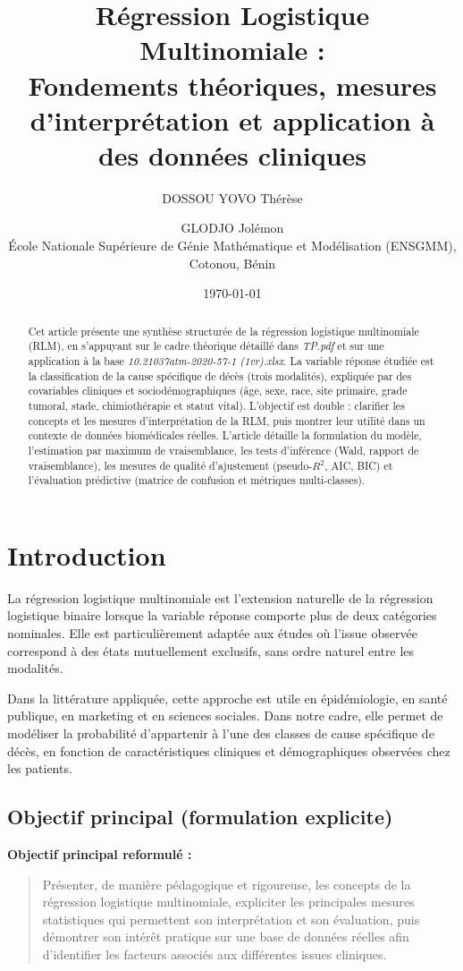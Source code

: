 \documentclass[12pt,a4paper]{article}
\title{\textbf{Régression Logistique Multinomiale :}\\
Fondements théoriques, mesures d'interprétation et application à des données cliniques}
\author{DOSSOU YOVO Thérèse \and GLODJO Jolémon\\
École Nationale Supérieure de Génie Mathématique et Modélisation (ENSGMM), Cotonou, Bénin}
\date{\today}
\begin{document}
\maketitle

\begin{abstract}
Cet article présente une synthèse structurée de la régression logistique multinomiale (RLM), en s'appuyant sur le cadre théorique détaillé dans \textit{TP.pdf} et sur une application à la base \textit{10.21037atm-2020-57-1 (1vr).xlsx}. La variable réponse étudiée est la classification de la cause spécifique de décès (trois modalités), expliquée par des covariables cliniques et sociodémographiques (âge, sexe, race, site primaire, grade tumoral, stade, chimiothérapie et statut vital). L'objectif est double : clarifier les concepts et les mesures d'interprétation de la RLM, puis montrer leur utilité dans un contexte de données biomédicales réelles. L'article détaille la formulation du modèle, l'estimation par maximum de vraisemblance, les tests d'inférence (Wald, rapport de vraisemblance), les mesures de qualité d'ajustement (pseudo-$R^2$, AIC, BIC) et l'évaluation prédictive (matrice de confusion et métriques multi-classes).
\end{abstract}

\section{Introduction}
La régression logistique multinomiale est l'extension naturelle de la régression logistique binaire lorsque la variable réponse comporte plus de deux catégories nominales. Elle est particulièrement adaptée aux études où l'issue observée correspond à des états mutuellement exclusifs, sans ordre naturel entre les modalités.

Dans la littérature appliquée, cette approche est utile en épidémiologie, en santé publique, en marketing et en sciences sociales. Dans notre cadre, elle permet de modéliser la probabilité d'appartenir à l'une des classes de cause spécifique de décès, en fonction de caractéristiques cliniques et démographiques observées chez les patients.

\subsection{Objectif principal (formulation explicite)}
\textbf{Objectif principal reformulé :}
\begin{quote}
Présenter, de manière pédagogique et rigoureuse, les concepts de la régression logistique multinomiale, expliciter les principales mesures statistiques qui permettent son interprétation et son évaluation, puis démontrer son intérêt pratique sur une base de données réelles afin d'identifier les facteurs associés aux différentes issues cliniques.
\end{quote}
\end{document}
